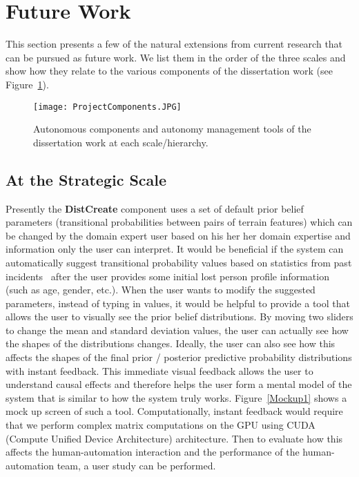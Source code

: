 \section{Future Work}
\label{futurework}

This section presents a few of the natural extensions from current research that can be pursued as future work. We list them in the order of the three scales and show how they relate to the various components of the dissertation work (see Figure~\ref{ProjectComponents2}).

\begin{figure}
\centering
\texttt{[image: ProjectComponents.JPG]}
\caption{Autonomous components and autonomy management tools of the dissertation work at each scale/hierarchy.}
\label{ProjectComponents2}
\end{figure}

\subsection{At the Strategic Scale}

Presently the \textbf{DistCreate} component uses a set of default prior belief parameters (transitional probabilities between pairs of terrain features) which can be changed by the domain expert user based on his her her domain expertise and information only the user can interpret. It would be beneficial if the system can automatically suggest transitional probability values based on statistics from past incidents~\cite{Koester2008Lost} after the user provides some initial lost person profile information (such as age, gender, etc.). When the user wants to modify the suggested parameters, instead of typing in values, it would be helpful to provide a tool that allows the user to visually see the prior belief distributions. By moving two sliders to change the mean and standard deviation values, the user can actually see how the shapes of the distributions changes. Ideally, the user can also see how this affects the shapes of the final prior / posterior predictive probability distributions with instant feedback. This immediate visual feedback allows the user to understand causal effects and therefore helps the user form a mental model of the system that is similar to how the system truly works. Figure~\ref{Mockup1} shows a mock up screen of such a tool. Computationally, instant feedback would require that we perform complex matrix computations on the GPU using CUDA (Compute Unified Device Architecture) architecture. Then to evaluate how this affects the human-automation interaction and the performance of the human-automation team, a user study can be performed.

